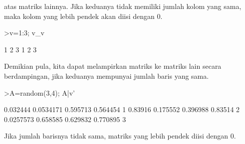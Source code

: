 \documentclass[a4paper,10pt]{article}
\begin{document}
\begin{eulernotebook}
\begin{eulercomment}
\begin{eulercomment}
\begin{eulercomment}
\begin{eulercomment}
\begin{eulercomment}
\begin{eulercomment}
\begin{eulercomment}
\begin{eulercomment}
\begin{eulercomment}
atas matriks lainnya. Jika keduanya tidak memiliki jumlah kolom yang
sama, maka kolom yang lebih pendek akan diisi dengan 0.
\end{eulercomment}
\begin{eulerprompt}
>v=1:3; v_v
\end{eulerprompt}
\begin{euleroutput}
              1             2             3 
              1             2             3 
\end{euleroutput}
\begin{eulercomment}
Demikian pula, kita dapat melampirkan matriks ke matriks lain secara
berdampingan, jika keduanya mempunyai jumlah baris yang sama.
\end{eulercomment}
\begin{eulerprompt}
>A=random(3,4); A|v'
\end{eulerprompt}
\begin{euleroutput}
       0.032444     0.0534171      0.595713      0.564454             1 
        0.83916      0.175552      0.396988       0.83514             2 
      0.0257573      0.658585      0.629832      0.770895             3 
\end{euleroutput}
\begin{eulercomment}
Jika jumlah barisnya tidak sama, matriks yang lebih pendek diisi
dengan 0.


\end{eulercomment}
\end{eulercomment}
\end{eulercomment}
\end{eulercomment}
\end{eulercomment}
\end{eulercomment}
\end{eulercomment}
\end{eulercomment}
\end{eulercomment}
\end{eulernotebook}
\end{document}
